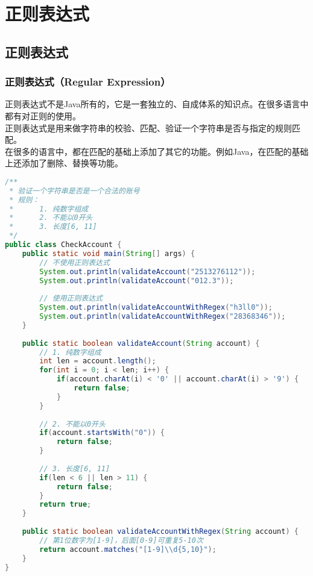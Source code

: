 \chapter{正则表达式}

\section{正则表达式}

\subsection{正则表达式（Regular Expression）}

正则表达式不是Java所有的，它是一套独立的、自成体系的知识点。在很多语言中都有对正则的使用。 \\

正则表达式是用来做字符串的校验、匹配、验证一个字符串是否与指定的规则匹配。 \\

在很多的语言中，都在匹配的基础上添加了其它的功能。例如Java，在匹配的基础上还添加了删除、替换等功能。 \\


\begin{lstlisting}[language=Java]
/**
 * 验证一个字符串是否是一个合法的账号
 * 规则：
 *      1. 纯数字组成
 *      2. 不能以0开头
 *      3. 长度[6, 11]
 */
public class CheckAccount {
    public static void main(String[] args) {
        // 不使用正则表达式
        System.out.println(validateAccount("2513276112"));
        System.out.println(validateAccount("012.3"));
        
        // 使用正则表达式
        System.out.println(validateAccountWithRegex("h3ll0"));
        System.out.println(validateAccountWithRegex("28368346"));
    }
    
    public static boolean validateAccount(String account) {
        // 1. 纯数字组成
        int len = account.length();
        for(int i = 0; i < len; i++) {
            if(account.charAt(i) < '0' || account.charAt(i) > '9') {
                return false;
            }
        }
        
        // 2. 不能以0开头
        if(account.startsWith("0")) {
            return false;
        }
        
        // 3. 长度[6, 11]
        if(len < 6 || len > 11) {
            return false;
        }
        return true;
    }
    
    public static boolean validateAccountWithRegex(String account) {
        // 第1位数字为[1-9]，后面[0-9]可重复5-10次
        return account.matches("[1-9]\\d{5,10}");
    }
}
\end{lstlisting}

